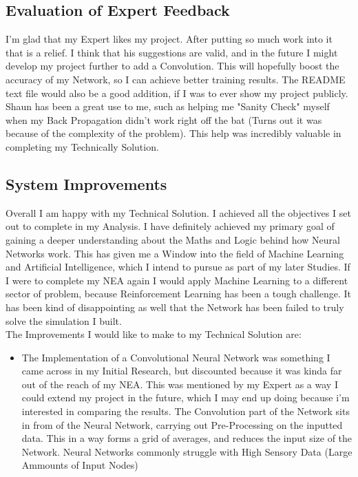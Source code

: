 \begin{flushleft}
    \subsection{Evaluation of Expert Feedback}
        \vspace{0.2cm}
        I'm glad that my Expert likes my project. After putting so much work into it that is a relief. I think that his suggestions are valid, and
        in the future I might develop my project further to add a Convolution. This will hopefully boost the accuracy of my Network, so I can achieve
        better training results. The README text file would also be a good addition, if I was to ever show my project publicly. \\
        \vspace{0.2cm}
        Shaun has been a great use to me, such as helping me "Sanity Check" myself when my Back Propagation didn't work right off the bat (Turns out
        it was because of the complexity of the problem). This help was incredibly valuable in completing my Technically Solution. \\
        \vspace{0.5cm}
    \subsection{System Improvements}
        \vspace{0.2cm}
        Overall I am happy with my Technical Solution. I achieved all the objectives I set out to complete in my Analysis. I have definitely achieved
        my primary goal of gaining a deeper understanding about the Maths and Logic behind how Neural Networks work. This has given me a Window into
        the field of Machine Learning and Artificial Intelligence, which I intend to pursue as part of my later Studies. If I were to complete my NEA
        again I would apply Machine Learning to a different sector of problem, because Reinforcement Learning has been a tough challenge. It has been
        kind of disappointing as well that the Network has been failed to truly solve the simulation I built. \\
        \vspace{0.2cm}
        The Improvements I would like to make to my Technical Solution are: \\
        \vspace{0.5cm}

        \begin{itemize}
            \item The Implementation of a Convolutional Neural Network was something I came across in my Initial Research, but discounted because it was
            kinda far out of the reach of my NEA. This was mentioned by my Expert as a way I could extend my project in the future, which I may end up
            doing because i'm interested in comparing the results. The Convolution part of the Network sits in from of the Neural Network, carrying out 
            Pre-Processing on the inputted data. This in a way forms a grid of averages, and reduces the input size of the Network. Neural Networks
            commonly struggle with High Sensory Data (Large Ammounts of Input Nodes)


\end{itemize}
\end{flushleft}
